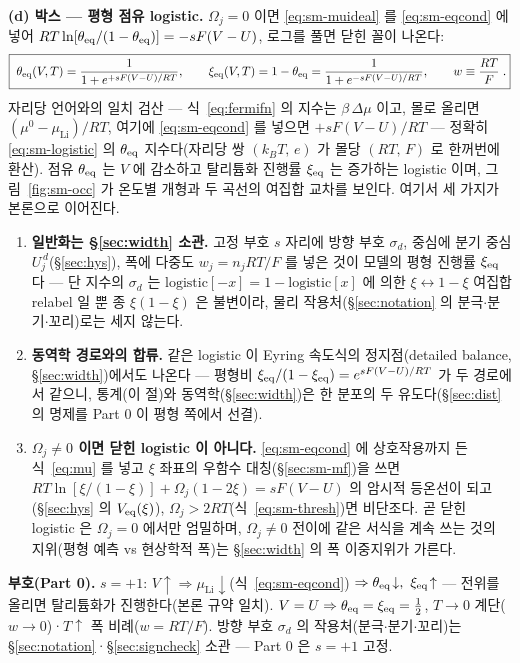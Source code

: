 \textbf{(d) 박스 --- 평형 점유 logistic.} $\Omega_j=0$ 이면 \eqref{eq:sm-muideal} 를 \eqref{eq:sm-eqcond} 에
넣어 $RT\ln[\theta_{\mathrm{eq}}/(1-\theta_{\mathrm{eq}})]=-sF(V-U)$, 로그를 풀면 닫힌 꼴이 나온다:
\begin{equation}
\boxed{\;\theta_{\mathrm{eq}}(V,T)=\frac{1}{1+e^{+sF(V-U)/RT}},\qquad
\xi_{\mathrm{eq}}(V,T)=1-\theta_{\mathrm{eq}}=\frac{1}{1+e^{-sF(V-U)/RT}},\qquad
w\equiv\frac{RT}{F}\;.}
\label{eq:sm-logistic}
\end{equation}
자리당 언어와의 일치 검산 --- 식~\eqref{eq:fermifn} 의 지수는 $\beta\,\Delta\mu$ 이고, 몰로 올리면
$(\mu^0-\mu_\mathrm{Li})/RT$, 여기에 \eqref{eq:sm-eqcond} 를 넣으면 $+sF(V-U)/RT$ --- 정확히
\eqref{eq:sm-logistic} 의 $\theta_{\mathrm{eq}}$ 지수다(자리당 쌍 $(k_BT,\,e)$ 가 몰당 $(RT,\,F)$ 로 한꺼번에 환산).
점유 $\theta_{\mathrm{eq}}$ 는 $V$ 에 감소하고 탈리튬화 진행률 $\xi_{\mathrm{eq}}$ 는 증가하는 logistic 이며,
그림~\ref{fig:sm-occ} 가 온도별 개형과 두 곡선의 여집합 교차를 보인다. 여기서 세 가지가 본론으로 이어진다.
\begin{enumerate}[label=(\roman*),leftmargin=2.2em,itemsep=1pt]
\item \textbf{일반화는 \S\ref{sec:width} 소관.} 고정 부호 $s$ 자리에 방향 부호 $\sigma_d$, 중심에 분기 중심
$U_j^{\,d}$(\S\ref{sec:hys}), 폭에 다중도 $w_j=n_jRT/F$ 를 넣은 것이 모델의 평형 진행률 $\xi_{\mathrm{eq}}$ 다 --- 단 지수의
$\sigma_d$ 는 $\mathrm{logistic}[-x]=1-\mathrm{logistic}[x]$ 에 의한 $\xi\leftrightarrow1-\xi$ 여집합
relabel 일 뿐 종 $\xi(1-\xi)$ 은 불변이라, 물리 작용처(\S\ref{sec:notation} 의 분극$\cdot$분기$\cdot$꼬리)로는
세지 않는다.
\item \textbf{동역학 경로와의 합류.} 같은 logistic 이 Eyring 속도식의 정지점(detailed balance,
\S\ref{sec:width})에서도 나온다 --- 평형비 $\xi_{\mathrm{eq}}/(1-\xi_{\mathrm{eq}})=e^{sF(V-U)/RT}$ 가 두 경로에서 같으니,
통계(이 절)와 동역학(\S\ref{sec:width})은 한 분포의 두 유도다(\S\ref{sec:dist} 의 명제를 Part 0 이 평형
쪽에서 선결).
\item \textbf{$\Omega_j\ne0$ 이면 닫힌 logistic 이 아니다.} \eqref{eq:sm-eqcond} 에 상호작용까지 든
식~\eqref{eq:mu} 를 넣고 $\xi$ 좌표의 우함수 대칭(\S\ref{sec:sm-mf})을 쓰면
$RT\ln[\xi/(1-\xi)]+\Omega_j(1-2\xi)=sF(V-U)$ 의 암시적 등온선이 되고(\S\ref{sec:hys} 의 $V_{\mathrm{eq}}(\xi)$),
$\Omega_j>2RT$(식~\eqref{eq:sm-thresh})면 비단조다. 곧 닫힌 logistic 은 $\Omega_j=0$ 에서만 엄밀하며,
$\Omega_j\ne0$ 전이에 같은 서식을 계속 쓰는 것의 지위(평형 예측 vs 현상학적 폭)는 \S\ref{sec:width} 의
폭 이중지위가 가른다.
\end{enumerate}

\begin{signbox}
\textbf{부호(Part 0).} $s=+1$: $V\!\uparrow\Rightarrow\mu_\mathrm{Li}\!\downarrow$(식~\eqref{eq:sm-eqcond})
$\Rightarrow\theta_\eq\!\downarrow,\ \xi_\eq\!\uparrow$ --- 전위를 올리면 탈리튬화가 진행한다(본론 규약 일치).
$V=U\Rightarrow\theta_{\mathrm{eq}}=\xi_{\mathrm{eq}}=\tfrac12$, $T\to0$ 계단($w\to0$)·$T\!\uparrow$ 폭 비례($w=RT/F$).
방향 부호 $\sigma_d$ 의 작용처(분극$\cdot$분기$\cdot$꼬리)는 \S\ref{sec:notation}·\S\ref{sec:signcheck} 소관 --- Part 0 은 $s=+1$ 고정.
\end{signbox}


